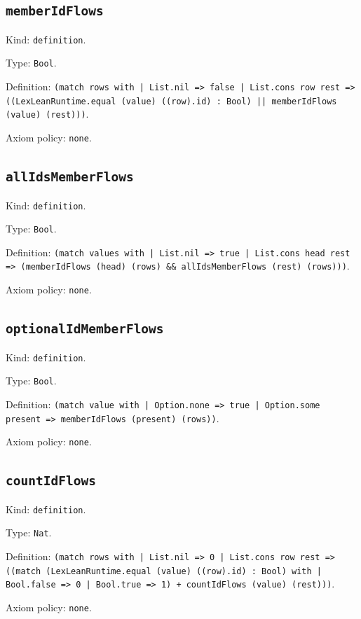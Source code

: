 \documentclass[11pt]{article}
\begin{document}
\subsection*{\texttt{memberIdFlows}}
\noindent Kind: \texttt{definition}.\par
\noindent Type: \texttt{Bool}.\par
\noindent Definition: \texttt{(match rows with | List.nil => false | List.cons row rest => ((LexLeanRuntime.equal (value) ((row).id) : Bool) || memberIdFlows (value) (rest)))}.\par
\noindent Axiom policy: \texttt{none}.\par
\subsection*{\texttt{allIdsMemberFlows}}
\noindent Kind: \texttt{definition}.\par
\noindent Type: \texttt{Bool}.\par
\noindent Definition: \texttt{(match values with | List.nil => true | List.cons head rest => (memberIdFlows (head) (rows) \&\& allIdsMemberFlows (rest) (rows)))}.\par
\noindent Axiom policy: \texttt{none}.\par
\subsection*{\texttt{optionalIdMemberFlows}}
\noindent Kind: \texttt{definition}.\par
\noindent Type: \texttt{Bool}.\par
\noindent Definition: \texttt{(match value with | Option.none => true | Option.some present => memberIdFlows (present) (rows))}.\par
\noindent Axiom policy: \texttt{none}.\par
\subsection*{\texttt{countIdFlows}}
\noindent Kind: \texttt{definition}.\par
\noindent Type: \texttt{Nat}.\par
\noindent Definition: \texttt{(match rows with | List.nil => 0 | List.cons row rest => ((match (LexLeanRuntime.equal (value) ((row).id) : Bool) with | Bool.false => 0 | Bool.true => 1) + countIdFlows (value) (rest)))}.\par
\noindent Axiom policy: \texttt{none}.\par
\end{document}
